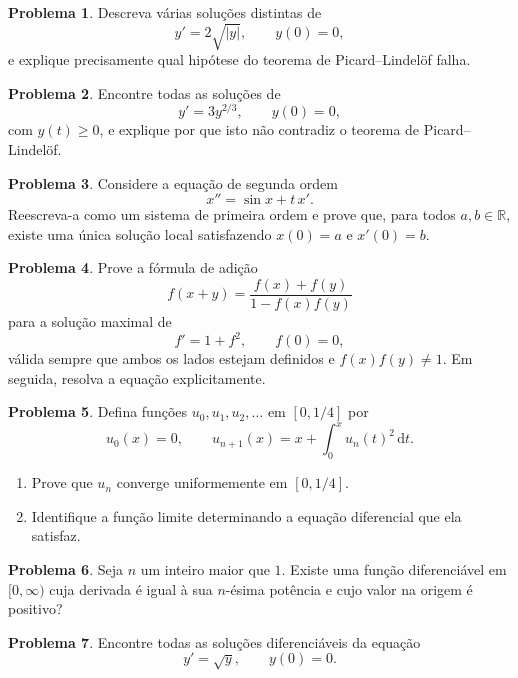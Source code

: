 \documentclass[10pt,a4paper]{amsart}
\newcommand{\R}{\mathbb{R}}
\renewcommand{\d}{\mathrm{d}}
\theoremstyle{definition}
\newtheorem{problema}{Problema}
\begin{document}
\begin{problema}
Descreva várias soluções distintas de
\[
    y'=2\sqrt{|y|}, \qquad y(0)=0,
\]
e explique precisamente qual hipótese do teorema de Picard--Lindelöf falha.
\end{problema}

\begin{problema}
Encontre todas as soluções de
\[
    y'=3y^{2/3}, \qquad y(0)=0,
\]
com $y(t)\ge 0$, e explique por que isto não contradiz o teorema de
Picard--Lindelöf.
\end{problema}

\begin{problema}
Considere a equação de segunda ordem
\[
    x''=\sin x+t\,x'.
\]
Reescreva-a como um sistema de primeira ordem e prove que, para todos
$a,b\in\R$, existe uma única solução local satisfazendo $x(0)=a$ e
$x'(0)=b$.
\end{problema}

\begin{problema}
Prove a fórmula de adição
\[
    f(x+y)=\frac{f(x)+f(y)}{1-f(x)f(y)}
\]
para a solução maximal de
\[
    f'=1+f^2, \qquad f(0)=0,
\]
válida sempre que ambos os lados estejam definidos e $f(x)f(y)\neq 1$. Em
seguida, resolva a equação explicitamente.
\end{problema}

\begin{problema}
Defina funções $u_0,u_1,u_2,\ldots$ em $[0,1/4]$ por
\[
    u_0(x)=0,
    \qquad
    u_{n+1}(x)=x+\int_0^x u_n(t)^2\,\d t.
\]
\begin{enumerate}[label=(\alph*)]
    \item Prove que $u_n$ converge uniformemente em $[0,1/4]$.
    \item Identifique a função limite determinando a equação diferencial que ela satisfaz.
\end{enumerate}
\end{problema}

\begin{problema}
Seja $n$ um inteiro maior que $1$. Existe uma função diferenciável em
$[0,\infty)$ cuja derivada é igual à sua $n$-ésima potência e cujo valor na
origem é positivo?
\end{problema}

\begin{problema}
Encontre todas as soluções diferenciáveis da equação
\[
    y'=\sqrt{y}, \qquad y(0)=0.
\]
\end{problema}

\end{document}
